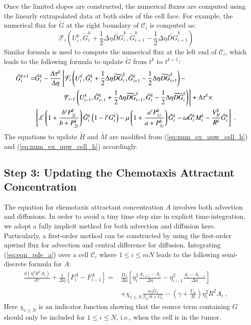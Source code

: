 \documentclass{amsart}
\theoremstyle{definition}
\theoremstyle{remark}
\numberwithin{equation}{section}
\numberwithin{figure}{section}
\begin{document}
Once the limited slopes are constructed, the numerical fluxes are computed using the linearly extrapolated data at both sides of the cell face.
For example, the numerical flux for $\tilde{G}$ at the right boundary of $\mathcal{C}_i$ is computed as:
\begin{displaymath}
\mathcal{F}_i\left(U_i^k,\tilde{G}_i^k+\frac{1}{2}\Delta\eta\widetilde{DG}^k_i,\tilde{G}_{i+1}^k-\frac{1}{2}\Delta\eta\widetilde{DG}^k_{i+1}\right)
\end{displaymath}
Similar formula is used to compute the numerical flux at the left end of $\mathcal{C}_i$, which leads to the following formula to update $\tilde{G}$ from $t^k$ to $t^{k+1}$:
\begin{align*}
\tilde{G}_i^{k+1} =& \tilde{G}_i^k - \frac{\Delta\tau^k}{\Delta\eta}\left[\mathcal{F}_i\left(U_i^k,\tilde{G}_i^k+\frac{1}{2}\Delta\eta\widetilde{DG}^k_i,\tilde{G}_{i+1}^k-\frac{1}{2}\Delta\eta\widetilde{DG}^k_{i+1}\right)-\right. \\
    &\qquad\qquad\left.\mathcal{F}_{i-1}\left(U_{i-1}^k,\tilde{G}_{i-1}^k+\frac{1}{2}\Delta\eta\widetilde{DG}^k_{i-1},\tilde{G}_i^k-\frac{1}{2}\Delta\eta\widetilde{DG}^k_i\right)\right] + \Delta\tau^k\times \\
\notag
    &\left[\lambda'\left(1+\frac{b'P_{2i}^k}{b+P_{2i}^k}\right)\tilde{G}_i^k\left(1-l'G_i^k\right)-\mu\left(1+\frac{a'P_{1i}^k}{a+P_{1i}^k}\right)\tilde{G}_i^k-\omega\tilde{G}_i^kM_i^k-\frac{V_N^k}{R^k}\tilde{G}_i^k\right]\;.
\end{align*}
The equations to update $\tilde{H}$ and $\tilde{M}$ are modified from (\ref{eq:num_ex_upw_cell_h}) and (\ref{eq:num_ex_upw_cell_h}) accordingly.

\subsection{Step 3: Updating the Chemotaxis Attractant Concentration}
The equation for chemotaxis attractant concentration $A$ involves both advection and diffusions.
In order to avoid a tiny time step size in explicit time-integration, we adopt a fully implicit method for both advection and diffusion here.
Particularly, a first-order method can be constructed by using the first-order upwind flux for advection and central difference for diffusion.
Integrating (\ref{eq:eqn_pde_a}) over a cell $\mathcal{C}_i$ where $1\le i\le mN$ leads to the following semi-discrete formula for $A$:
\begin{align*}
\frac{d(\eta_i^2R^2A_i)}{d\tau} + \frac{1}{\Delta\eta}\left[F_i^A-F_{i-1}^A\right] =& \frac{D_3}{\Delta\eta}\left[\eta_i^2\frac{A_{i+1}-A_i}{\Delta\eta}-\eta_{i-1}^2\frac{A_i-A_{i-1}}{\Delta\eta}\right] \\
&+ \chi_{i\le N}\frac{\alpha_3\tilde{G}_i}{\beta_3/\theta+G_i}-\left(\gamma+\frac{V_N}{R}\right)\eta_i^2R^2A_i\;,
\end{align*}
Here $\chi_{i\le N}$ is an indicator function showing that the source term containing $G$ should only be included for $1\le i\le N$, i.e., when the cell is in the tumor.
\end{document}
